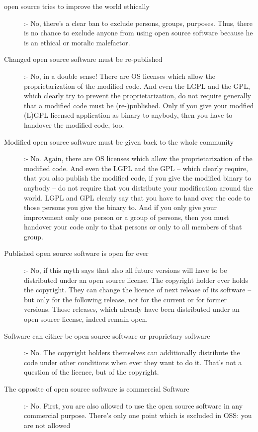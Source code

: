 \begin{description}
  \item[open source tries to improve the world ethically] :- No, there's a clear
  ban to exclude persons, groups, purposes. Thus, there is no chance to exclude
  anyone from using open source software because he is an ethical or moralic
  malefactor.
  \item[Changed open source software must be re-published] :- No, in a double
  sense! There are OS licenses which allow the proprietarization of the
  modified code. And even the LGPL and the GPL, which clearly try to prevent
  the proprietarization, do not require generally that a modified code must be
  (re-)published. Only if you give your modfied (L)GPL licensed application as
  binary to anybody, then you have to handover the modified code, too.
  \item[Modified open source software must be given back to the whole community]
  :- No. Again, there are OS licenses which allow the proprietarization of the
  modified code. And even the LGPL and the GPL -- which clearly require, that you
  also publish the modified code, if you give the modified binary to anybody --
  do not require that you distribute your modification around the world. LGPL and
  GPL clearly say that you have to hand over the code to those persons you
  give the binary to. And if you only give your improvement only one person or a
  group of persons, then you must handover your code only to that persons or
  only to all members of that group.
  \item[Published open source software is open for ever] :- No, if this myth
  says that also all future versions will have to be distributed under an open
  source license. The copyright holder ever holds the copyright. They can change
  the licence of next release of its software -- but only for the following
  release, not for the current or for former versions. Those releases, which
  already have been distributed under an open source license, indeed remain
  open.
  \item[Software can either be open source software or proprietary software] :-
  No. The copyright holders themselves can additionally distribute the code
  under other conditions when ever they want to do it. That's not a question of
  the licence, but of the copyright.  
  \item[The opposite of open source software is commercial Software] :- No.
  First, you are also allowed to use the open source software in any commercial
  purpose. There's only one point which is excluded in OSS: you are not allowed

\end{description}
